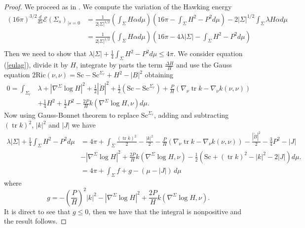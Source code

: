 \documentclass[12pt,a4paper]{amsart}
\theoremstyle{plain}
\theoremstyle{definition}
\newcommand{\tr}{\operatorname{tr}}
\begin{document}
\begin{proof}
We proceed as in \cite[Theorem 4]{willflat}. We compute the variation of the Hawking energy
\begin{equation}
    \begin{split}
        (16 \pi)^{3/2} \frac{d}{ds}  \mathcal{E}(\Sigma_s)_{|s=0}&= \frac{1}{2|\Sigma|^{1/2} }\left(\int_\Sigma H \alpha d\mu \right) \left(16 \pi -  \int_\Sigma H^2-P^2 d\mu \right)-  2 |\Sigma|^{1/2} \int_\Sigma \lambda H \alpha d\mu\\
        &=\frac{1}{2|\Sigma|^{1/2} }\left(\int_\Sigma H \alpha d\mu \right) \left(16 \pi - 4 \lambda |\Sigma| - \int_\Sigma H^2-P^2 d\mu \right)\\
    \end{split}
\end{equation}
Then  we need to show that $\lambda |\Sigma| + \frac{1}{4}\int_\Sigma H^2-P^2 d\mu \leq 4 \pi$. 
We consider  equation (\ref{eulag}), divide it  by $H$, integrate by parts the term $\frac{\Delta H}{H}$ and use the Gauss equation $2\mathrm{Ric}(\nu, \nu) = \mathrm{Sc} -\mathrm{Sc}^{\Sigma_r} + H^2 -|B|^2  $ obtaining
\begin{equation*}
\begin{split}
   0=  \int_{\Sigma_r}&\lambda+ |\nabla^\Sigma  \log H|^2 + \frac{1}{2} |\mathring{B}|^2+  \frac{1}{2}(\mathrm{Sc} -\mathrm{Sc}^{\Sigma_r}) +\frac{P}{H}( \nabla_\nu \tr k - \nabla_\nu k(\nu,\nu ))\\& +\frac{1}{4}H^2 + \frac{1}{2} P^2 - \frac{2P}{H}  k(\nabla^\Sigma \log H, \nu)d\mu. 
    \end{split}
\end{equation*}
Now using  Gauss-Bonnet theorem to replace $\mathrm{Sc}^{\Sigma_r}$,  adding and subtracting $(\tr k)^2$, $|k|^2$ and $|J|$ we have 
\begin{equation*}
\begin{split}
   \lambda |\Sigma|+  \frac{1}{4}\int_\Sigma H^2-P^2 d\mu &= 4\pi +\int_\Sigma \frac{(\tr k)^2}{2 } - \frac{|k|^2}{2} -\frac{P}{H}( \nabla_\nu \tr k - \nabla_\nu k(\nu,\nu ))  - \frac{|\mathring{B}|^2}{2}   - \frac{3}{4} P^2 -|J| \\
   &   -|\nabla^\Sigma  \log H|^2 + \frac{2P}{H}  k(\nabla^\Sigma \log H, \nu) -\frac{1}{2}(\mathrm{Sc} + (\tr k)^2 - |k|^2-2|J|) d\mu.\\
    &=4\pi +\int_\Sigma  f+g -(\mu-|J|)\, d\mu
    \end{split}
\end{equation*}
where 
$$g= -\left( \frac{P}{H}\right)^2|k|^2 -|\nabla^\Sigma  \log H|^2 + \frac{2P}{H}  k(\nabla^\Sigma \log H, \nu). $$
It is direct to see that $g\leq 0$, then we have that the integral is nonpositive and the result follows.
\end{proof}
\end{document}
